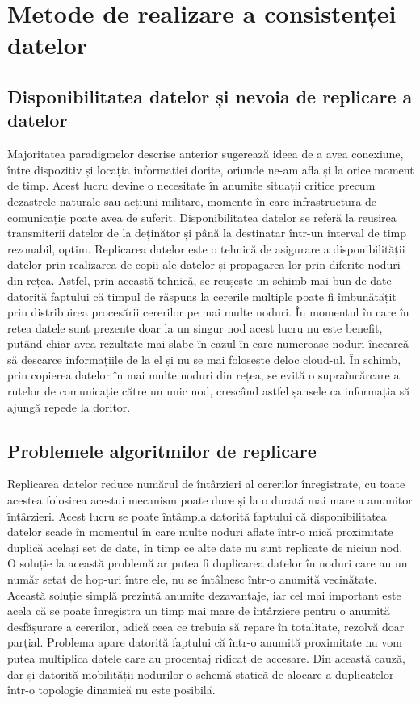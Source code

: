 \documentclass[12pt,a4paper]{report}
\begin{document}
\section{Metode de realizare a consistenței datelor} \label{metodeExistenteConsistenta}
\subsection{Disponibilitatea datelor și nevoia de replicare a datelor}
Majoritatea paradigmelor descrise anterior sugerează ideea de a avea conexiune, între dispozitiv și locația informației dorite, oriunde ne-am afla și la orice moment de timp. Acest lucru devine o necesitate în anumite situații critice precum dezastrele naturale sau acțiuni militare, momente în care infrastructura de comunicație poate avea de suferit. Disponibilitatea datelor se referă la reușirea transmiterii datelor de la deținător și până la destinatar într-un interval de timp rezonabil, optim. Replicarea datelor este o tehnică de asigurare a disponibilității datelor prin realizarea de copii ale datelor și propagarea lor prin diferite noduri din rețea. Astfel, prin această tehnică, se reușește un schimb mai bun de date datorită faptului că timpul de răspuns la cererile multiple poate fi îmbunătățit prin distribuirea procesării cererilor pe mai multe noduri. În momentul în care în rețea datele sunt prezente doar la un singur nod acest lucru nu este benefit, putând chiar avea rezultate mai slabe în cazul în care numeroase noduri încearcă să descarce informațiile de la el și nu se mai folosește deloc cloud-ul. În schimb, prin copierea datelor în mai multe noduri din rețea, se evită o supraîncărcare a rutelor de comunicație către un unic nod, crescând astfel șansele ca informația să ajungă repede la doritor. 
\subsection{Problemele algoritmilor de replicare}
Replicarea datelor reduce numărul de întârzieri al cererilor înregistrate, cu toate acestea folosirea acestui mecanism poate duce și la o durată mai mare a anumitor întârzieri. Acest lucru se poate întâmpla datorită faptului că disponibilitatea datelor scade în momentul în care multe noduri aflate într-o mică proximitate duplică același set de date, în timp ce alte date nu sunt replicate de niciun nod. O soluție la această problemă ar putea fi duplicarea datelor în noduri care au un număr setat de hop-uri între ele, nu se întâlnesc într-o anumită vecinătate. Această soluție simplă prezintă anumite dezavantaje, iar cel mai important este acela că se poate înregistra un timp mai mare de întârziere pentru o anumită desfășurare a cererilor, adică ceea ce trebuia să repare în totalitate, rezolvă doar parțial. Problema apare datorită faptului că într-o anumită proximitate nu vom putea multiplica datele care au procentaj ridicat de accesare. Din această cauză, dar și datorită mobilității nodurilor o schemă statică de alocare a duplicatelor într-o topologie dinamică nu este posibilă.
\end{document}
